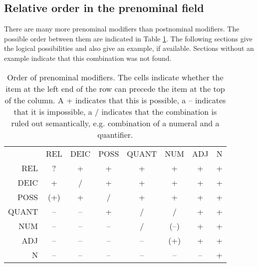


\subsection{Relative order in the prenominal field}\label{sec:nppp:Relativeorderintheprenominalfield}


There are many more prenominal modifiers than postnominal modifiers. The possible order between them are indicated in Table \ref{tab:OrderOfPrenominalModifiers}. 
The following sections give the logical possibilities and also give an example, if available. Sections without an example indicate that this combination was not found.



\begin{table}
	\centering
 \begin{tabular}{rccccccc}
~
 &
REL &
DEIC &
POSS &
QUANT &
NUM &
ADJ &
N\\ 
REL &
? &
+ &
+ &
+ &
+ &
+ &
+\\
DEIC &
+ &
/ &
+ &
+ &
+ &
+ &
+\\
POSS &
(+) &
+ &
/ &
+ &
+ &
+ &
+\\
QUANT &
-- &
-- &
+ &
/ &
/ &
+ &
+\\
NUM &
-- &
-- &
-- &
/ &
(--) &
+ &
+\\
ADJ &
-- &
-- &
-- &
-- &
(+) &
+ &
+\\
N &
-- &
-- &
-- &
-- &
-- &
-- &
+\\
\end{tabular} 
	\caption[Order of prenominal modifiers]{Order of prenominal modifiers. The cells indicate whether the item at the left end of the row can precede the item at the top of the column. A + indicates that this is possible, a -- indicates that it is impossible, a / indicates that the combination is ruled out semantically, e.g. combination of a numeral and a quantifier.}
	\label{tab:OrderOfPrenominalModifiers}
\end{table} 


